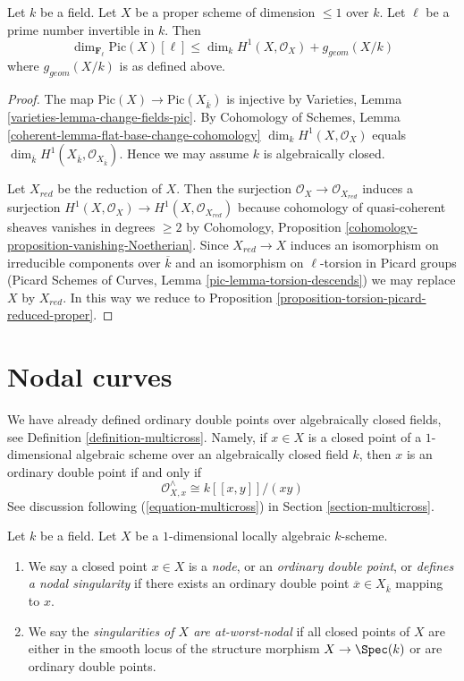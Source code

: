 \begin{lemma}
\label{lemma-bound-torsion-simple}
Let $k$ be a field. Let $X$ be a proper scheme of dimension $\leq 1$ over $k$.
Let $\ell$ be a prime number invertible in $k$. Then
$$
\dim_{\mathbf{F}_\ell} \text{Pic}(X)[\ell] \leq
\dim_k H^1(X, \mathcal{O}_X) + g_{geom}(X/k)
$$
where $g_{geom}(X/k)$ is as defined above.
\end{lemma}

\begin{proof}
The map $\text{Pic}(X) \to \text{Pic}(X_{\overline{k}})$
is injective by Varieties, Lemma \ref{varieties-lemma-change-fields-pic}.
By Cohomology of Schemes, Lemma \ref{coherent-lemma-flat-base-change-cohomology}
$\dim_k H^1(X, \mathcal{O}_X)$ equals
$\dim_{\overline{k}} H^1(X_{\overline{k}}, \mathcal{O}_{X_{\overline{k}}})$.
Hence we may assume $k$ is algebraically closed.

\medskip\noindent
Let $X_{red}$ be the reduction of $X$. Then the surjection
$\mathcal{O}_X \to \mathcal{O}_{X_{red}}$ induces a surjection
$H^1(X, \mathcal{O}_X) \to H^1(X, \mathcal{O}_{X_{red}})$
because cohomology of quasi-coherent sheaves vanishes in degrees
$\geq 2$ by
Cohomology, Proposition \ref{cohomology-proposition-vanishing-Noetherian}.
Since $X_{red} \to X$ induces an isomorphism on irreducible
components over $\overline{k}$ and an isomorphism on
$\ell$-torsion in Picard groups
(Picard Schemes of Curves, Lemma \ref{pic-lemma-torsion-descends})
we may replace $X$ by $X_{red}$. In this way we reduce to
Proposition \ref{proposition-torsion-picard-reduced-proper}.
\end{proof}






\section{Nodal curves}
\label{section-nodal}

\noindent
We have already defined ordinary double points over algebraically
closed fields, see Definition \ref{definition-multicross}. Namely,
if $x \in X$ is a closed point of a $1$-dimensional
algebraic scheme over an algebraically closed field $k$, then
$x$ is an ordinary double point if and only if
$$
\mathcal{O}_{X, x}^\wedge \cong k[[x, y]]/(xy)
$$
See discussion following (\ref{equation-multicross}) in
Section \ref{section-multicross}.

\begin{definition}
\label{definition-nodal}
Let $k$ be a field. Let $X$ be a $1$-dimensional locally algebraic $k$-scheme.
\begin{enumerate}
\item We say a closed point $x \in X$ is a {\it node}, or an
{\it ordinary double point}, or {\it defines a nodal singularity}
if there exists an ordinary double point $\overline{x} \in X_{\overline{k}}$
mapping to $x$.
\item We say the {\it singularities of $X$ are at-worst-nodal} if
all closed points of $X$ are either in the smooth locus of
the structure morphism $X \to \Spec(k)$ or are ordinary double points.
\end{enumerate}
\end{definition}


